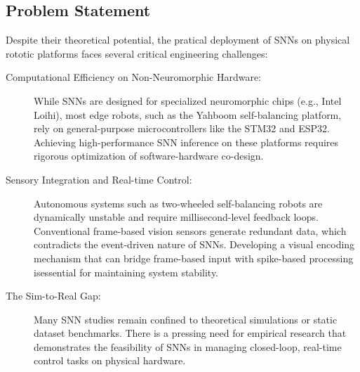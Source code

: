 \subsection{Problem Statement}
Despite their theoretical potential, the pratical deployment of SNNs on 
physical rototic platforms faces several critical engineering challenges:
\begin{description}
    \item[Computational Efficiency on Non-Neuromorphic Hardware:] While SNNs are 
    designed for specialized neuromorphic 
    chips (e.g., Intel Loihi), most edge robots, such as the Yahboom self-balancing 
    platform,
     rely on general-purpose microcontrollers like the STM32 and ESP32.
      Achieving high-performance SNN inference on these platforms requires rigorous 
      optimization of software-hardware co-design.
    
    \item[Sensory Integration and Real-time Control:] Autonomous systems such as two-wheeled
    self-balancing robots are dynamically unstable and require millisecond-level feedback loops. 
    Conventional frame-based vision sensors generate redundant data, which contradicts 
    the event-driven nature of SNNs. Developing a visual encoding mechanism that can bridge 
    frame-based input with spike-based processing isessential for maintaining system stability.

    
    \item[The Sim-to-Real Gap:] Many SNN studies remain confined to theoretical simulations
    or static dataset benchmarks. There is a pressing need for empirical research that demonstrates
    the feasibility of SNNs in managing closed-loop, real-time control tasks on physical hardware.
\end{description}

